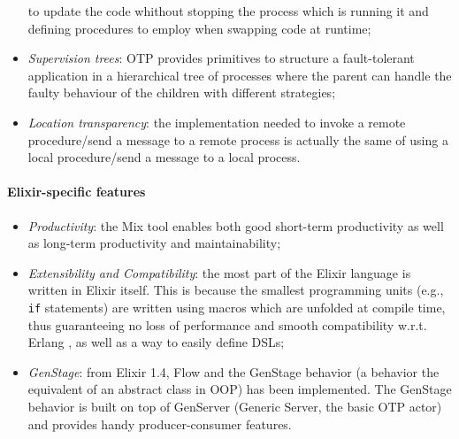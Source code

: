 \begin{itemize}
        to update the code whithout stopping the process which is running it
        and defining procedures to employ when swapping code at runtime;
    \item \textit{Supervision trees}: OTP provides primitives to structure a
        fault-tolerant application in a hierarchical tree of processes where
        the parent can handle the faulty behaviour of the children with
        different strategies;
    \item \textit{Location transparency}: the implementation needed to invoke a
        remote procedure/send a message to a remote process is actually the same
        of using a local procedure/send a message to a local process.
\end{itemize}

\paragraph{Elixir-specific features}
\begin{itemize}
  \item \textit{Productivity}: the Mix tool enables both good short-term
        productivity as well as long-term productivity and maintainability;
  \item \textit{Extensibility and Compatibility}: the most part of the Elixir
        language is written in Elixir itself. This is because the smallest
        programming units (e.g., \texttt{if} statements) are written using
        macros which are unfolded at compile time, thus guaranteeing no loss of
        performance and smooth compatibility w.r.t. Erlang , as well as a way
        to easily define DSLs;
  \item \textit{GenStage}: from Elixir 1.4, Flow and the GenStage behavior
        (a behavior the equivalent of an abstract class in OOP) has been
        implemented.
        The GenStage behavior is built on top of GenServer (Generic
        Server, the basic OTP actor) and provides handy producer-consumer
        features.
\end{itemize}
